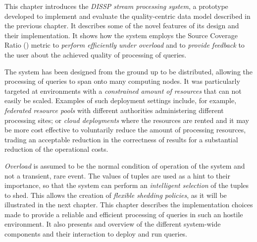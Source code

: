 This chapter introduces the \emph{DISSP stream processing system}, a prototype developed to implement and
evaluate the quality-centric data model described in the previous chapter. 
It describes some of the novel features of its design and their implementation.
It shows how the system employs the Source Coverage Ratio (\sic) metric to \emph{perform efficiently
under overload} and to \emph{provide feedback} to the user about the achieved quality of processing of queries.

The system has been designed from the ground up to be distributed, allowing the processing of queries to
span onto many computing nodes.
It was particularly targeted at environments with a \emph{constrained amount of resources} that can not
easily be scaled. Examples of such deployment settings include, for example, \emph{federated resource
pools} with different authorities administering different processing sites; or \emph{cloud deployments}
where the resources are rented and it may be more cost effective to voluntarily reduce the amount of
processing resources, trading an acceptable reduction in the correctness of results for a substantial 
reduction of the operational costs. 

\emph{Overload} is assumed to be the normal condition of operation of the system and not a transient,
rare event. 
The \sic values of tuples are used as a hint to their importance, so that the system can perform an 
\emph{intelligent selection} of the tuples to shed. This allows the creation of \emph{flexible shedding
policies}, as it will be illustrated in the next chapter.
This chapter describes the implementation choices made to provide a reliable and efficient
processing of queries in such an hostile environment.
It also presents and overview of the different system-wide components and their interaction to deploy and
run queries. 

\pagebreak
